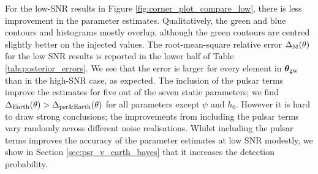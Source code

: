 \documentclass[fleqn,usenatbib,useAMS]{mnras}
\begin{document}
For the low-SNR results in Figure \ref{fig:corner_plot_compare_low}, there is less improvement in the parameter estimates. Qualitatively, the green and blue contours and histograms mostly overlap, although the green contours are centred slightly better on the injected values. The root-mean-square relative error $\Delta_{\rm M}(\theta)$ for the low SNR results is reported in the lower half of Table \ref{tab:posterior_errors}. We see that the error is larger for every element in $\boldsymbol{\theta}_{\rm gw}$ than in the high-SNR case, as expected. The inclusion of the pulsar terms improve the estimates for five out of the seven static parameters; we find $\Delta_{\rm Earth}(\theta) > \Delta_{\rm psr \& Earth}(\theta)$ for all parameters except $\psi$ and $h_0$. However it is hard to draw strong conclusions; the improvements from including the pulsar terms vary randomly across different noise realisations. Whilst including the pulsar terms improves the accuracy of the parameter estimates at low SNR modestly, we show in Section \ref{sec:psr_v_earth_bayes} that it increases the detection probability. \newline 
\end{document}

